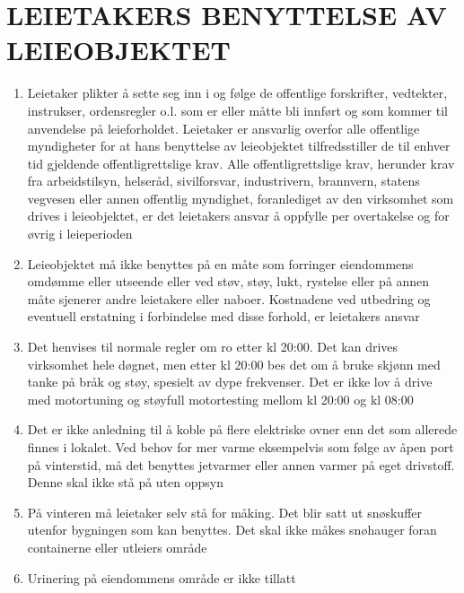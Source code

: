 \section{LEIETAKERS BENYTTELSE AV LEIEOBJEKTET}


    \begin{enumerate}


        \item Leietaker plikter å sette seg inn i og følge de offentlige forskrifter, vedtekter, instrukser, ordensregler
        o.l. som er eller måtte bli innført og som kommer til anvendelse på leieforholdet. Leietaker er ansvarlig
        overfor alle offentlige myndigheter for at hans benyttelse av leieobjektet tilfredsstiller de til enhver tid
        gjeldende offentligrettslige krav. Alle offentligrettslige krav, herunder krav fra arbeidstilsyn, helseråd,
        sivilforsvar, industrivern, brannvern, statens vegvesen eller annen offentlig myndighet, foranlediget av den virksomhet som
        drives i leieobjektet, er det leietakers ansvar å oppfylle per overtakelse og for øvrig i leieperioden

        \item Leieobjektet må ikke benyttes på en måte som forringer eiendommens omdømme eller utseende eller
        ved støv, støy, lukt, rystelse eller på annen måte sjenerer andre leietakere eller naboer. Kostnadene ved utbedring og eventuell
        erstatning i forbindelse med disse forhold, er leietakers ansvar

        \item Det henvises til normale regler om ro etter kl 20:00. Det kan drives virksomhet hele døgnet, men etter kl 20:00 bes det om å bruke skjønn med tanke på bråk og støy, spesielt av dype frekvenser. Det er ikke lov å drive med motortuning og støyfull motortesting mellom kl 20:00 og kl 08:00

        \item Det er ikke anledning til å koble på flere elektriske ovner enn det som allerede finnes i lokalet. Ved behov for mer varme eksempelvis som følge av åpen port på vinterstid, må det benyttes jetvarmer eller annen varmer på eget drivstoff. Denne skal ikke stå på uten oppsyn

        \item På vinteren må leietaker selv stå for måking. Det blir satt ut snøskuffer utenfor bygningen som kan benyttes. Det skal ikke måkes snøhauger foran containerne eller utleiers område

        \item Urinering på eiendommens område er ikke tillatt


\end{enumerate}
